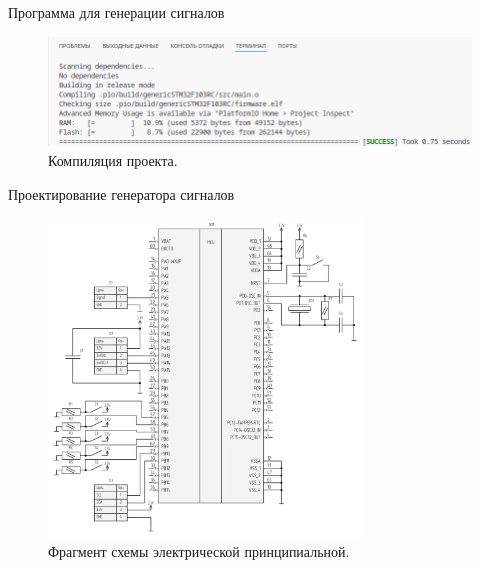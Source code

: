 \documentclass[10pt]{beamer}
\begin{document}
\begin{frame}{Программа для генерации сигналов}
  \begin{figure}
  \includegraphics[width=1.05\textwidth]{compile}
  \caption{Компиляция проекта.}
  \end{figure}
\end{frame}

\begin{frame}{Проектирование генератора сигналов}
  \begin{figure}
  \includegraphics[width=0.75\textwidth]{scheme-cropped}
  \caption{Фрагмент схемы электрической принципиальной.}
  \end{figure}
\end{frame}
\end{document}
